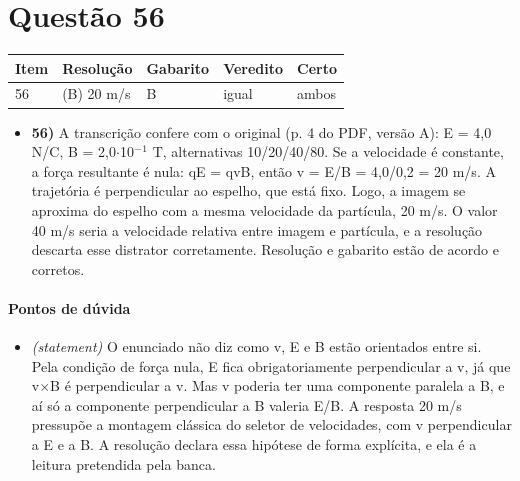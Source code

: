 \documentclass{article}%
\begin{document}
\section*{Questão 56}%
\begin{longtable}{@{}p{} p{} p{} p{} p{}@{}}\toprule Item & Resolução & Gabarito & Veredito & Certo \\ \midrule
56 & (B) 20 m/s & B & igual & ambos \\
\bottomrule\end{longtable}%
\begin{itemize}%
\item%
\textbf{56)} A transcrição confere com o original (p. 4 do PDF, versão A): E = 4,0 N/C, B = 2,0$\cdot$10$^{-}$$^{1}$ T, alternativas 10/20/40/80. Se a velocidade é constante, a força resultante é nula: qE = qvB, então v = E/B = 4,0/0,2 = 20 m/s. A trajetória é perpendicular ao espelho, que está fixo. Logo, a imagem se aproxima do espelho com a mesma velocidade da partícula, 20 m/s. O valor 40 m/s seria a velocidade relativa entre imagem e partícula, e a resolução descarta esse distrator corretamente. Resolução e gabarito estão de acordo e corretos.%
\end{itemize}%
\paragraph{Pontos de dúvida}%
\begin{itemize}%
\item%
\textit{(statement)} O enunciado não diz como v, E e B estão orientados entre si. Pela condição de força nula, E fica obrigatoriamente perpendicular a v, já que v$\times$B é perpendicular a v. Mas v poderia ter uma componente paralela a B, e aí só a componente perpendicular a B valeria E/B. A resposta 20 m/s pressupõe a montagem clássica do seletor de velocidades, com v perpendicular a E e a B. A resolução declara essa hipótese de forma explícita, e ela é a leitura pretendida pela banca.%
\end{itemize}%
\end{document}
